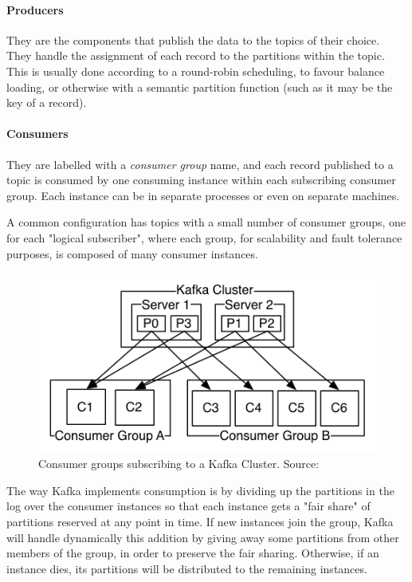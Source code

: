 \paragraph{Producers} They are the components that publish the data to the topics of their choice. They handle the assignment of each record to the partitions within the topic. This is usually done according to a round-robin scheduling, to favour balance loading, or otherwise with a semantic partition function (such as it may be the key of a record).

\paragraph{Consumers} They are labelled with a \textit{consumer group} name, and each record published to a topic is consumed by one consuming instance within each subscribing consumer group. Each instance can be in separate processes or even on separate machines.

A common configuration has topics with a small number of consumer groups, one for each "logical subscriber", where each group, for scalability and fault tolerance purposes, is composed of many consumer instances.

\begin{figure}[h]
    \centering
    \includegraphics[width=0.7\linewidth]{Figures/consumer-groups}
    \caption[Consumer groups subscribing to a Kafka Cluster]{Consumer groups subscribing to a Kafka Cluster. Source: \cite{kafka_doc}}
    \label{fig:consumer-groups}
\end{figure}


The way Kafka implements consumption is by dividing up the partitions in the log over the consumer instances so that each instance gets a "fair share" of partitions reserved at any point in time. If new instances join the group, Kafka will handle dynamically this addition by giving away some partitions from other members of the group, in order to preserve the fair sharing. Otherwise, if an instance dies, its partitions will be distributed to the remaining instances.

